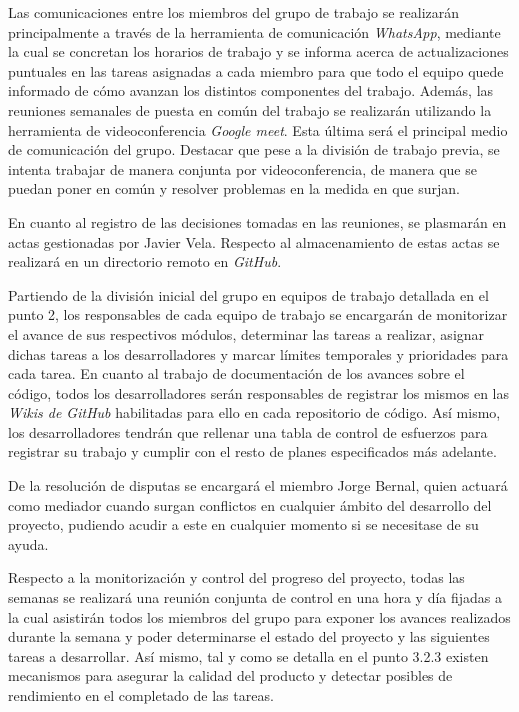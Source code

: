 \documentclass{article}
\begin{document}
Las comunicaciones entre los miembros del grupo de trabajo se realizarán principalmente a través de la herramienta 
de comunicación \textit{WhatsApp}, mediante la cual se concretan los horarios de trabajo 
y se informa acerca de actualizaciones puntuales en las tareas asignadas a cada miembro para que todo el equipo quede 
informado de cómo avanzan los distintos componentes del trabajo. 
Además, las reuniones semanales de puesta en común del trabajo se realizarán utilizando la herramienta de videoconferencia 
\textit{Google meet}. Esta última será el principal medio de comunicación del grupo. 
Destacar que pese a la división de trabajo previa, se intenta trabajar de manera conjunta por videoconferencia, 
de manera que se puedan poner en común y resolver problemas en la medida en que surjan.

En cuanto al registro de las decisiones tomadas en las reuniones, se plasmarán en actas gestionadas 
por Javier Vela. Respecto al almacenamiento de estas actas se realizará en un directorio remoto en \textit{GitHub}.

Partiendo de la división inicial del grupo en equipos de trabajo detallada en el punto 2, los responsables
de cada equipo de trabajo se encargarán de monitorizar el avance de sus respectivos módulos, determinar 
las tareas a realizar, asignar dichas tareas a los desarrolladores y marcar límites temporales y prioridades para cada tarea.
En cuanto al trabajo de documentación de los avances sobre el código, todos los desarrolladores serán responsables 
de registrar los mismos en las \textit{Wikis de GitHub} habilitadas para ello en cada repositorio de código.
Así mismo, los desarrolladores tendrán que rellenar una tabla de control de esfuerzos para registrar su trabajo y 
cumplir con el resto de planes especificados más adelante.

De la resolución de disputas se encargará el miembro Jorge Bernal, quien actuará como mediador cuando surgan conflictos en cualquier
ámbito del desarrollo del proyecto, pudiendo acudir a este en cualquier momento si se necesitase de su ayuda.

Respecto a la monitorización y control del progreso del proyecto, todas las semanas se realizará una reunión conjunta
de control en una hora y día fijadas a la cual asistirán todos los miembros del grupo para exponer los avances realizados
durante la semana y poder determinarse el estado del proyecto y las siguientes tareas a desarrollar. Así mismo, tal y como
se detalla en el punto 3.2.3 existen mecanismos para asegurar la calidad del producto y detectar posibles de rendimiento en 
el completado de las tareas.
\end{document}
